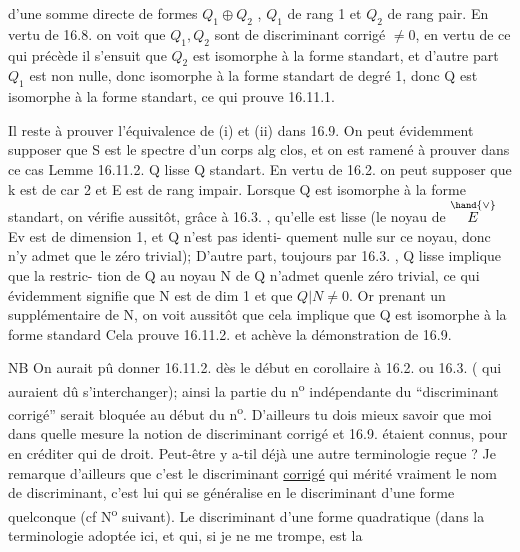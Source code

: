 
d'une somme directe de formes $Q_1 \oplus Q_2$ , $Q_1$ de rang 1 et $Q_2$ de rang pair.
En vertu de 16.8. on voit que $Q_1,Q_2$ sont de discriminant corrigé
$\neq 0$, en vertu de ce qui précède il s'ensuit que $Q_2$ est isomorphe à la
forme standart, et d'autre part $Q_1$ est non nulle, donc isomorphe à la
forme standart de degré 1, donc Q est isomorphe à la forme standart, ce
qui prouve 16.11.1.

Il reste à prouver l'équivalence de (i) et (ii) dans 16.9. On peut
évidemment supposer que S est le spectre d'un corps alg clos, et on est 
ramené à prouver dans ce cas  Lemme 16.11.2. Q lisse \hand{$\Longleftrightarrow$} Q standart.
En vertu de 16.2. on peut supposer que k est de car 2 et E est de rang
impair.  Lorsque Q est isomorphe à la forme
standart,  on vérifie aussitôt, grâce à 16.3. , qu'elle
est lisse (le noyau de $\overset{\hand{\vee}}{E}$ \hand{$\longrightarrow$}Ev est de dimension 1, et Q n'est pas identi-%
quement nulle sur ce noyau, donc n'y admet que le zéro trivial); 
D'autre part,  toujours par 16.3. , Q lisse  implique que  la restric-%
tion de Q au noyau N de Q n'admet quenle zéro trivial, ce qui évidemment
signifie  que N est de dim 1 et que $Q|N \neq 0$. Or prenant un supplémentaire
de N, on voit aussitôt que cela implique que Q est isomorphe à la forme
standard\hand{/} Cela prouve 16.11.2. et achève la démonstration de 16.9.

NB On aurait pû donner 16.11.2. dès le début en corollaire à
16.2. ou 16.3. ( qui auraient dû s'interchanger); ainsi la partie du n\textsuperscript{o}
indépendante du ``discriminant corrigé'' serait bloquée au début du n\textsuperscript{o}.
D'ailleurs tu dois mieux savoir que moi dans quelle mesure la notion
de discriminant corrigé et 16.9. étaient connus, pour en créditer qui de
droit. Peut-être y a-t\hand{\unsure{-}}il déjà une autre terminologie reçue ? Je remarque
d'ailleurs que c'est le discriminant \uline{corrigé} qui mérité vraiment le nom
de discriminant, c'est lui qui se généralise en le discriminant d'une
forme quelconque (cf N\textsuperscript{o} suivant). Le discriminant d'une forme quadratique
(dans la terminologie adoptée ici, et qui, si je ne me trompe, est la

